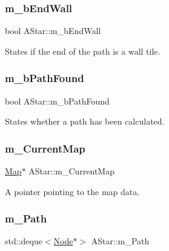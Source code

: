 \subsubsection{\texorpdfstring{m\+\_\+b\+End\+Wall}{m\_bEndWall}}
{\footnotesize\ttfamily bool A\+Star\+::m\+\_\+b\+End\+Wall\hspace{0.3cm}{\ttfamily [private]}}



States if the end of the path is a wall tile. 

\mbox{\label{class_a_star_a16ef2dc0a317f629702153f79efdc7bd}} 
\subsubsection{\texorpdfstring{m\+\_\+b\+Path\+Found}{m\_bPathFound}}
{\footnotesize\ttfamily bool A\+Star\+::m\+\_\+b\+Path\+Found\hspace{0.3cm}{\ttfamily [private]}}



States whether a path has been calculated. 

\mbox{\label{class_a_star_ac97bc1a05e13febf9c8e3cd1a76a42b2}} 
\subsubsection{\texorpdfstring{m\+\_\+\+Current\+Map}{m\_CurrentMap}}
{\footnotesize\ttfamily \hyperlink{class_map}{Map}$\ast$ A\+Star\+::m\+\_\+\+Current\+Map\hspace{0.3cm}{\ttfamily [private]}}



A pointer pointing to the map data. 

\mbox{\label{class_a_star_adca58c26b853ae0c31568ba72233d00d}} 
\subsubsection{\texorpdfstring{m\+\_\+\+Path}{m\_Path}}
{\footnotesize\ttfamily std\+::deque$<$\hyperlink{struct_node}{Node}$\ast$$>$ A\+Star\+::m\+\_\+\+Path\hspace{0.3cm}{\ttfamily [private]}}




